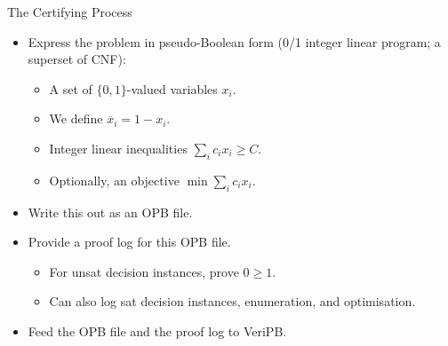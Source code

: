 \documentclass{beamer}
\begin{document}
\begin{frame}{The Certifying Process}
    \begin{itemize}
        \item Express the problem in pseudo-Boolean form (0/1 integer linear program; a superset of CNF):
            \begin{itemize}
                \item A set of $\{0, 1\}$-valued variables $x_i$.
                \item We define $\overline{x}_i = 1 - x_i$.
                \item Integer linear inequalities $\sum_{i} c_i x_i \ge C$.
                \item Optionally, an objective $\operatorname{min} \sum_{i} c_i x_i$.
            \end{itemize}
        \item Write this out as an OPB file.
        \item Provide a proof log for this OPB file.
            \begin{itemize}
                \item For unsat decision instances, prove $0 \ge 1$.
                \item Can also log sat decision instances, enumeration, and optimisation.
            \end{itemize}
        \item Feed the OPB file and the proof log to VeriPB.
    \end{itemize}
\end{frame}
\end{document}
